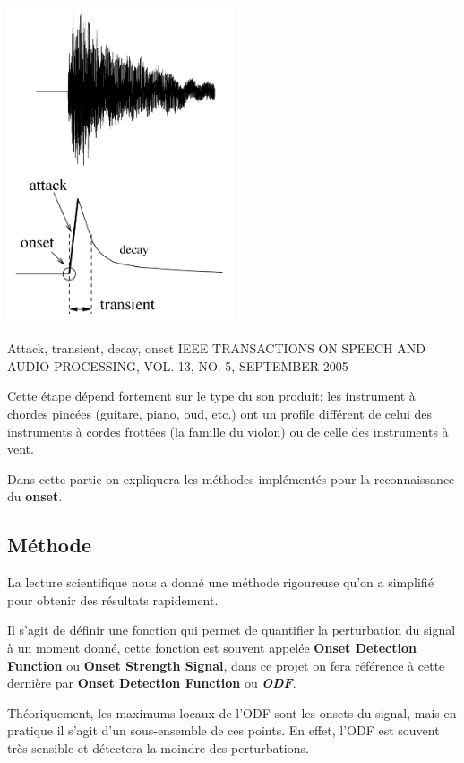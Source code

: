 \documentclass[french,]{article}
\begin{document}
\includegraphics[width=0.5\textwidth,height=\textheight]{img/onset.png}

Attack, transient, decay, onset IEEE TRANSACTIONS ON SPEECH AND AUDIO
PROCESSING, VOL. 13, NO. 5, SEPTEMBER 2005

Cette étape dépend fortement sur le type du son produit; les instrument
à chordes pincées (guitare, piano, oud, etc.) ont un profile différent
de celui des instruments à cordes frottées (la famille du violon) ou de
celle des instruments à vent.

Dans cette partie on expliquera les méthodes implémentés pour la
reconnaissance du \textbf{onset}.

\hypertarget{methode}{%
\subsection{Méthode}\label{methode}}

La lecture scientifique nous a donné une méthode rigoureuse qu'on a
simplifié pour obtenir des résultats rapidement.

Il s'agit de définir une fonction qui permet de quantifier la
perturbation du signal à un moment donné, cette fonction est souvent
appelée \textbf{Onset Detection Function} ou \textbf{Onset Strength
Signal}, dans ce projet on fera référence à cette dernière par
\textbf{Onset Detection Function} ou \textbf{\emph{ODF}}.

Théoriquement, les maximums locaux de l'ODF sont les onsets du signal,
mais en pratique il s'agit d'un sous-ensemble de ces points. En effet,
l'ODF est souvent très sensible et détectera la moindre des
perturbations.
\end{document}
